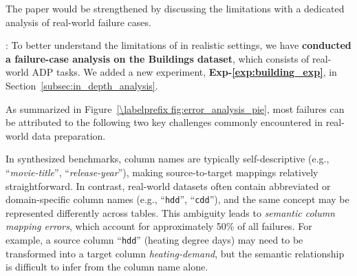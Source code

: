 \begin{shaded}
{
 The paper would be strengthened by discussing the limitations with a dedicated analysis of real-world failure cases.
}
\end{shaded}



:
To better understand the limitations of \sys in realistic settings, we have \textbf{conducted a failure-case analysis on the Buildings dataset}, which consists of real-world ADP tasks. We added a new experiment, \textbf{Exp-\ref{exp:building_exp}}, in Section~\ref{subsec:in_depth_analysis}.

As summarized in Figure~\ref{\labelprefix fig:error_analysis_pie}, most failures can be attributed to the following two key challenges commonly encountered in real-world data preparation.

%

In synthesized benchmarks, column names are typically self-descriptive (e.g., ``\textit{movie-title}'', ``\textit{release-year}''), making source-to-target mappings relatively straightforward. In contrast, real-world datasets often contain abbreviated or domain-specific column names (e.g., ``\texttt{hdd}'', ``\texttt{cdd}''), and the same concept may be represented differently across tables. This ambiguity leads to \emph{semantic column mapping errors}, which account for approximately 50\% of all failures. For example, a source column ``\texttt{hdd}'' (heating degree days) may need to be transformed into a target column \textit{heating-demand}, but the semantic relationship is difficult to infer from the column name alone.


